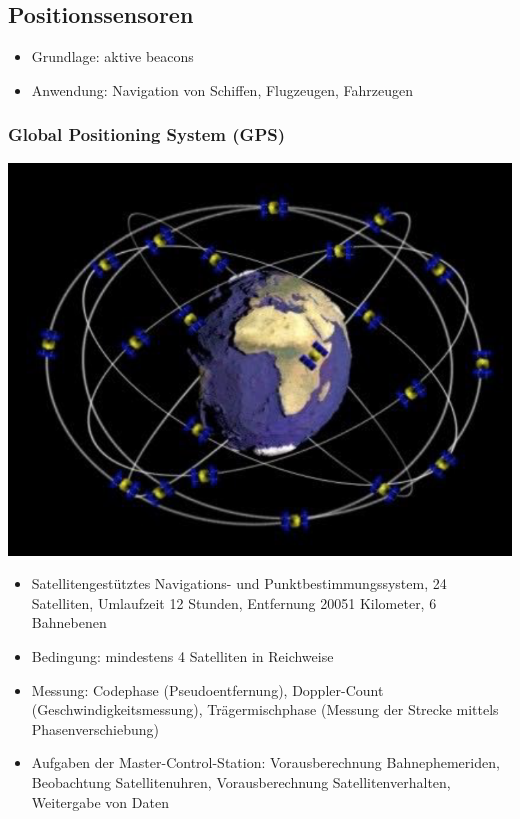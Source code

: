 \documentclass[paper=a4, fontsize=11pt]{scrartcl} %
\numberwithin{equation}{section} %
\numberwithin{figure}{section} %
\numberwithin{table}{section} %
\begin{document}
\subsection{Positionssensoren}

\begin{itemize}
\item Grundlage: aktive beacons
\item Anwendung: Navigation von Schiffen, Flugzeugen, Fahrzeugen
\end{itemize}

\subsubsection{Global Positioning System (GPS)}

\begin{minipage}{0.3\textwidth}
\includegraphics[width=\textwidth]{imgs/gps}
\end{minipage}
\begin{minipage}{0.6\textwidth}
\begin{itemize}
\item Satellitengestütztes Navigations- und Punktbestimmungssystem, 24 Satelliten, Umlaufzeit 12 Stunden, Entfernung 20051 Kilometer, 6 Bahnebenen
\item Bedingung: mindestens 4 Satelliten in Reichweise
\item Messung: Codephase (Pseudoentfernung), Doppler-Count (Geschwindigkeitsmessung), Trägermischphase (Messung der Strecke mittels Phasenverschiebung)
\item Aufgaben der Master-Control-Station: Vorausberechnung Bahnephemeriden, Beobachtung Satellitenuhren, Vorausberechnung Satellitenverhalten, Weitergabe von Daten
\end{itemize}
\end{minipage}
\end{document}
